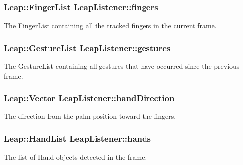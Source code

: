 \subsubsection[{\texorpdfstring{fingers}{fingers}}]{\setlength{\rightskip}{0pt plus 5cm}Leap\+::\+Finger\+List Leap\+Listener\+::fingers\hspace{0.3cm}{\ttfamily [private]}}\hypertarget{classLeapListener_a5a04519bc2603793328375ad5e049773}{}\label{classLeapListener_a5a04519bc2603793328375ad5e049773}
The Finger\+List containing all the tracked fingers in the current frame. 
\subsubsection[{\texorpdfstring{gestures}{gestures}}]{\setlength{\rightskip}{0pt plus 5cm}Leap\+::\+Gesture\+List Leap\+Listener\+::gestures\hspace{0.3cm}{\ttfamily [private]}}\hypertarget{classLeapListener_a724e5b46ff12f8982cbc4c378cfc7323}{}\label{classLeapListener_a724e5b46ff12f8982cbc4c378cfc7323}
The Gesture\+List containing all gestures that have occurred since the previous frame. 
\subsubsection[{\texorpdfstring{hand\+Direction}{handDirection}}]{\setlength{\rightskip}{0pt plus 5cm}Leap\+::\+Vector Leap\+Listener\+::hand\+Direction\hspace{0.3cm}{\ttfamily [private]}}\hypertarget{classLeapListener_ad8458a1467b2909621a4b1f116a4b5be}{}\label{classLeapListener_ad8458a1467b2909621a4b1f116a4b5be}
The direction from the palm position toward the fingers. 
\subsubsection[{\texorpdfstring{hands}{hands}}]{\setlength{\rightskip}{0pt plus 5cm}Leap\+::\+Hand\+List Leap\+Listener\+::hands\hspace{0.3cm}{\ttfamily [private]}}\hypertarget{classLeapListener_ac01cc7c1b36a473a942842b6068a8bc1}{}\label{classLeapListener_ac01cc7c1b36a473a942842b6068a8bc1}
The list of Hand objects detected in the frame. 

